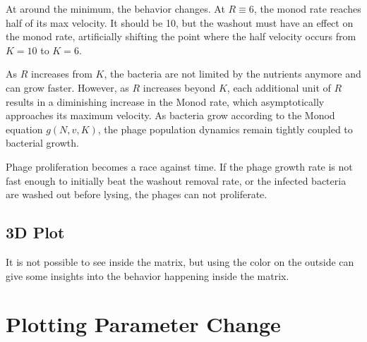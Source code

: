 At around the minimum, the behavior changes. 
At $R\equiv 6$, the monod rate reaches half of its max velocity. 
It should be 10, but the washout must have an effect on the monod rate, artificially shifting the point where the half velocity occurs from $K=10$ to $K=6$. 

As $R$ increases from $K$, the bacteria are not limited by the nutrients anymore and can grow faster. 
However, as $R$ increases beyond $K$, each additional unit of $R$ results in a diminishing increase in the Monod rate, which asymptotically approaches its maximum velocity. 
As bacteria grow according to the Monod equation $g(N, v, K)$, the phage population dynamics remain tightly coupled to bacterial growth. 

Phage proliferation becomes a race against time. 
If the phage growth rate is not fast enough to initially beat the washout removal rate, or the infected bacteria are washed out before lysing, the phages can not proliferate. 

\subsection{3D Plot}
It is not possible to see inside the matrix, but using the color on the outside can give some insights into the behavior happening inside the matrix. 


\section{Plotting Parameter Change}
